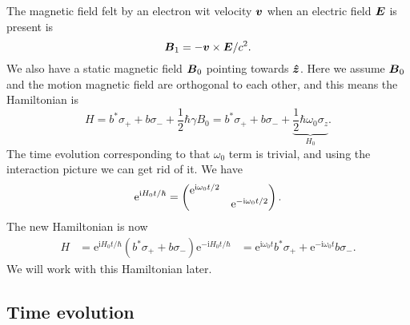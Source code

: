 \documentclass[hyperref, a4paper]{article}
\newcommand*{\ii}{\mathrm{i}}
\newcommand*{\ee}{\mathrm{e}}
\def\\{}%
\begin{document}
The magnetic field felt by an electron wit velocity $\vb*{v}$ 
when an electric field $\vb*{E}$ is present is 
\begin{equation}
    \vb*{B}_1 =-\vb*{v} \times \vb*{E} / c^2.
    \label{eq:motion-magnetic}
\end{equation}
We also have a static magnetic field $\vb*{B}_0$ pointing towards $\vu*{z}$.
Here we assume $\vb*{B}_0$ and the motion magnetic field 
are orthogonal to each other, 
and this means the Hamiltonian is 
\begin{equation}
    H = b^* \sigma_+ + b \sigma_- + \frac{1}{2} \hbar \gamma B_0
    = b^* \sigma_+ + b \sigma_- + \underbrace{\frac{1}{2} \hbar \omega_0 \sigma_z}_{H_0}.
\end{equation}
The time evolution corresponding to that $\omega_0$ term is trivial, 
and using the interaction picture we can get rid of it. 
We have 
\begin{equation}
    \ee^{\ii H_0 t / \hbar} = \pmqty{
        \dmat{
            \ee^{\ii \omega_0 t / 2}, 
            \ee^{- \ii \omega_0 t / 2}
        }
    }.
\end{equation}
The new Hamiltonian is now 
\begin{equation}
    \begin{aligned}
        H &= \ee^{\ii H_0 t / \hbar} (b^* \sigma_+ + b \sigma_-) \ee^{- \ii H_0  t/ \hbar} \\
        &= \ee^{\ii \omega_0 t} b^* \sigma_+ + \ee^{- \ii \omega_0 t} b \sigma_-.
    \end{aligned}
\end{equation}
We will work with this Hamiltonian later.

\subsection{Time evolution}
\end{document}
